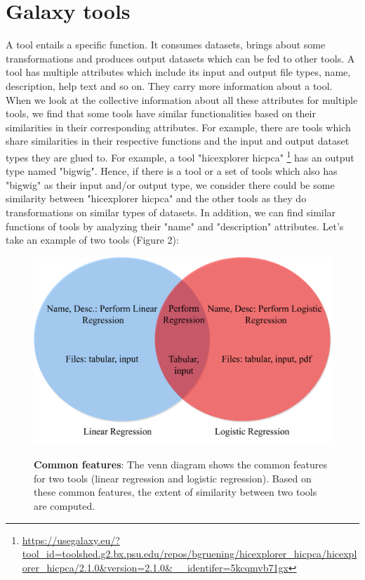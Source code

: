\section{Galaxy tools}
A tool entails a specific function. It consumes datasets, brings about some transformations and produces output datasets which can be fed to other tools. A tool has multiple attributes which include its input and output file types, name, description, help text and so on. They carry more information about a tool. When we look at the collective information about all these attributes for multiple tools, we find that some tools have similar functionalities based on their similarities in their corresponding attributes. For example, there are tools which share similarities in their respective functions and the input and output dataset types they are glued to. For example, a tool "hicexplorer hicpca" \footnote{\url{https://usegalaxy.eu/?tool_id=toolshed.g2.bx.psu.edu/repos/bgruening/hicexplorer_hicpca/hicexplorer_hicpca/2.1.0&version=2.1.0&__identifer=5kcqmvb71gx}}  has an output type named "bigwig". Hence, if there is a tool or a set of tools which also has "bigwig" as their input and/or output type, we consider there could be some similarity between "hicexplorer hicpca" and the other tools as they do transformations on similar types of datasets. In addition, we can find similar functions of tools by analyzing their "name" and "description" attributes. Let's take an example of two tools (Figure 2):
 
\begin{figure}[h]
\begin{centering}
    {\includegraphics[scale=0.5]{figures/Venn_common_tools_info.pdf}}
    \caption[Venn diagram]{\textbf{Common features}: The venn diagram shows the common features for two tools (linear regression and logistic regression). Based on these common features, the extent of similarity between two tools are computed.}
\end{centering}
\end{figure}

